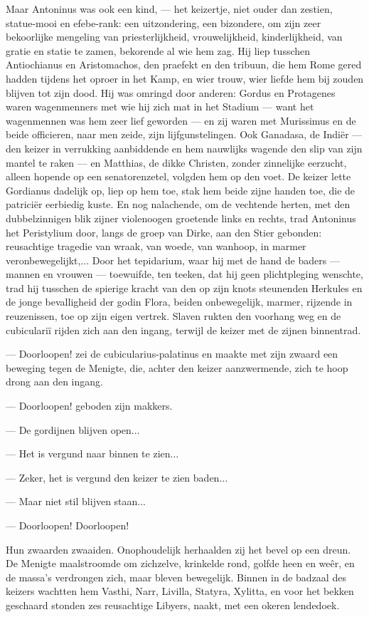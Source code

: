 \documentclass[a4paper, 12pt, oneside, dutch]{article}
\begin{document}
Maar Antoninus was ook een kind, --- het keizertje, niet ouder dan zestien, statue-mooi en efebe-rank: een uitzondering, een bizondere, om zijn zeer bekoorlijke mengeling van priesterlijkheid, vrouwelijkheid, kinderlijkheid, van gratie en statie te zamen, bekorende al wie hem zag. Hij liep tusschen Antiochianus en Aristomachos, den praefekt en den tribuun, die hem Rome gered hadden tijdens het oproer in het Kamp, en wier trouw, wier liefde hem bij zouden blijven tot zijn dood. Hij was omringd door anderen: Gordus en Protagenes waren wagenmenners met wie hij zich mat in het Stadium --- want het wagenmennen was hem zeer lief geworden --- en zij waren met Murissimus en de beide officieren, naar men zeide, zijn lijfgunstelingen. Ook Ganadasa, de Indiër --- den keizer in verrukking aanbiddende en hem nauwlijks wagende den slip van zijn mantel te raken --- en Matthias, de dikke Christen, zonder zinnelijke eerzucht, alleen hopende op een senatorenzetel, volgden hem op den voet. De keizer lette Gordianus dadelijk op, liep op hem toe, stak hem beide zijne handen toe, die de patriciër eerbiedig kuste. En nog nalachende, om de vechtende herten, met den dubbelzinnigen blik zijner violenoogen groetende links en rechts, trad Antoninus het Peristylium door, langs de groep van Dirke, aan den Stier gebonden: reusachtige tragedie van wraak, van woede, van wanhoop, in marmer veronbewegelijkt,... Door het tepidarium, waar hij met de hand de baders --- mannen en vrouwen --- toewuifde, ten teeken, dat hij geen plichtpleging wenschte, trad hij tusschen de spierige kracht van den op zijn knots steunenden Herkules en de jonge bevalligheid der godin Flora, beiden onbewegelijk, marmer, rijzende in reuzenissen, toe op zijn eigen vertrek. Slaven rukten den voorhang weg en de cubiculariï rijden zich aan den ingang, terwijl de keizer met de zijnen binnentrad.

--- Doorloopen! zei de cubicularius-palatinus en maakte met zijn zwaard een beweging tegen de Menigte, die, achter den keizer aanzwermende, zich te hoop drong aan den ingang.

--- Doorloopen! geboden zijn makkers.

--- De gordijnen blijven open...

--- Het is vergund naar binnen te zien...

--- Zeker, het is vergund den keizer te zien baden...

--- Maar niet stil blijven staan...

--- Doorloopen! Doorloopen!

Hun zwaarden zwaaiden. Onophoudelijk herhaalden zij het bevel op een dreun. De Menigte maalstroomde om zichzelve, krinkelde rond, golfde heen en weêr, en de massa's verdrongen zich, maar bleven bewegelijk. Binnen in de badzaal des keizers wachtten hem Vasthi, Narr, Livilla, Statyra, Xylitta, en voor het bekken geschaard stonden zes reusachtige Libyers, naakt, met een okeren lendedoek.
\end{document}
